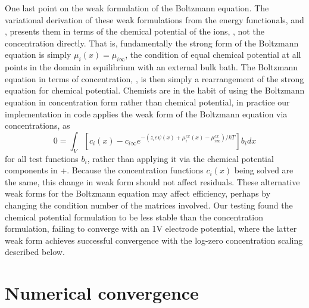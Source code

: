 One last point on the weak formulation of the Boltzmann equation. The variational
derivation of these weak formulations from the energy functionals,
 and , presents them in terms of the
chemical potential of the ions, , not the concentration directly. That
is, fundamentally the strong form of the Boltzmann equation is simply $\mu_i(x) =
\mu_{i\infty}$, the condition of equal chemical potential at all
points in the domain in equilibrium with an external bulk bath.
The Boltzmann
equation in terms of 
concentration, , is then simply a rearrangement of
the strong equation for chemical potential. Chemists are in the
habit of using the Boltzmann equation in concentration form rather
than chemical potential, in practice our implementation in code applies the weak
form of the Boltzmann equation via concentrations, as
\begin{equation}
0 =   \int_V \left[ c_i(x) - c_{i\infty}
    e^{-\left(z_i e \psi(x) +
      \mu_i^{ex}(x)-\mu_{i\infty}^{ex}\right)/kT} \right] b_i
dx 
\label{weak_Boltzmann_conc}
\end{equation}
for all test functions $b_i$, rather than applying it via the chemical
potential components in 
+. Because the concentration functions $c_i(x)$ being
solved are the same, this change in weak form should not affect
residuals.  These alternative weak forms for the Boltzmann
equation may affect efficiency, perhaps by changing the condition number
of the matrices involved. Our
testing found the chemical potential formulation to be less stable than the
concentration formulation, failing to converge with an 1V electrode
potential, where the latter weak form achieves successful convergence
with the log-zero concentration scaling described below.

\section{Numerical convergence}

